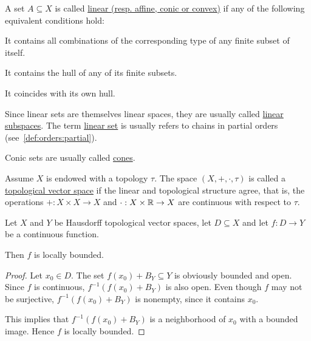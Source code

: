 \begin{definition}\label{def:analysis/linear_combination_sets}
  A set $A \subseteq X$ is called \uline{linear (resp. affine, conic or convex)} if any of the following equivalent conditions hold:

  \begin{defenum}
    \item It contains all combinations of the corresponding type of any finite subset of itself.
    \item It contains the hull of any of its finite subsets.
    \item It coincides with its own hull.
  \end{defenum}

  Since linear sets are themselves linear spaces, they are usually called \uline{linear subspaces}. The term \uline{linear set} is usually refers to chains in partial orders (see~\cref{def:orders:partial}).

  Conic sets are usually called \uline{cones}.
\end{definition}

\begin{definition}\label{def:topological_vector_space}
  Assume $X$ is endowed with a topology $\tau$. The space $(X, +, \cdot, \tau)$ is called a \uline{topological vector space} if the linear and topological structure agree, that is, the operations $+: X \times X \to X$ and $\cdot: X \times \mathbb{R} \to X$ are continuous with respect to $\tau$.
\end{definition}

\begin{proposition}\label{thm:continuous_implies_locally_bounded}
  Let $X$ and $Y$ be Hausdorff topological vector spaces, let $D \subseteq X$ and let $f: D \to Y$ be a continuous function.

  Then $f$ is locally bounded.
\end{proposition}
\begin{proof}
  Let $x_0 \in D$. The set $f(x_0) + B_Y \subseteq Y$ is obviously bounded and open. Since $f$ is continuous, $f^{-1}(f(x_0) + B_Y)$ is also open. Even though $f$ may not be surjective, $f^{-1}(f(x_0) + B_Y)$ is nonempty, since it contains $x_0$.

  This implies that $f^{-1}(f(x_0) + B_Y)$ is a neighborhood of $x_0$ with a bounded image. Hence $f$ is locally bounded.
\end{proof}
